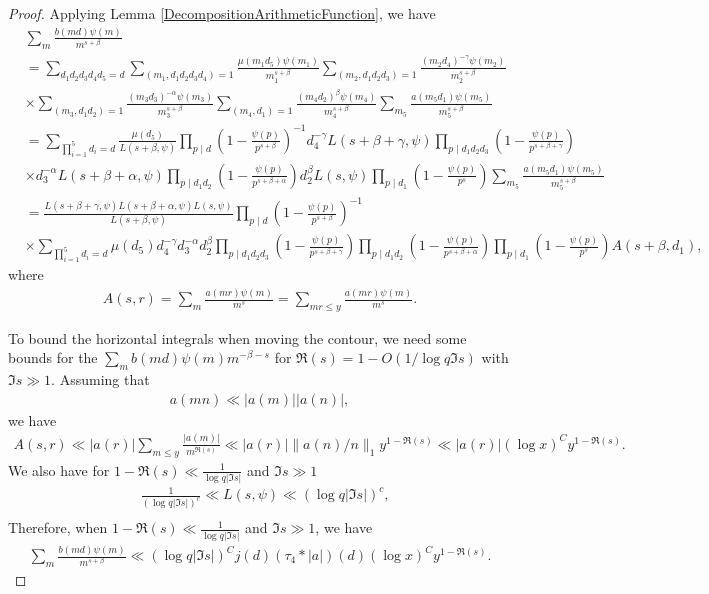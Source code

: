 \documentclass[oneside, 12pt]{amsart}
\theoremstyle{definition}
\begin{document}
\begin{proof}
Applying Lemma \ref{DecompositionArithmeticFunction}, we have 
\begin{align*}
&\sum_{m}\frac{b(md)\psi(m)}{m^{s+\beta}}\\&=\sum_{d_1d_2d_3d_4d_5=d}\sum_{(m_1, d_1d_2d_3d_4)=1}\frac{\mu(m_1d_5)\psi(m_1)}{m_1^{s+\beta}}\sum_{(m_2,d_1d_2d_3)=1}\frac{(m_2d_4)^{-\gamma}\psi(m_2)}{m_2^{s+\beta}}
\\& \times \sum_{(m_3,d_1d_2)=1}\frac{(m_3d_3)^{-\alpha}\psi(m_3)}{m_3^{s+\beta}}\sum_{(m_4,d_1)=1}\frac{(m_4d_2)^\beta\psi(m_4)}{m_4^{s+\beta}}\sum_{m_5}\frac{a(m_5d_1)\psi(m_5)}{m_5^{s+\beta}}\\
& =\sum_{\prod_{i=1}^5d_i=d}\frac{\mu(d_5)}{L(s+\beta, \psi)}\prod_{p\mid d}\left( 1-\frac{\psi(p)}{p^{s+\beta}}\right)^{-1}d_4^{-\gamma}L(s+\beta+\gamma, \psi)\prod_{p\mid d_1d_2d_3}\left(1-\frac{\psi(p)}{p^{s+\beta+\gamma}}\right)\\
& \times d_3^{-\alpha} L(s+\beta+\alpha, \psi)\prod_{p\mid d_1d_2}\left( 1-\frac{\psi(p)}{p^{s+\beta+\alpha}}\right)d_2^\beta L(s, \psi)\prod_{p\mid d_1}\left(1-\frac{\psi(p)}{p^s}\right)\sum_{m_5}\frac{a(m_5d_1)\psi(m_5)}{m_5^{s+\beta}}\\
&=\frac{L(s+\beta+\gamma, \psi)L(s+\beta+\alpha, \psi)L(s, \psi)}{L(s+\beta, \psi)}\prod_{p\mid d}\left( 1-\frac{\psi(p)}{p^{s+\beta}}\right)^{-1}\\& \times \sum_{\prod_{i=1}^5 d_i=d}\mu(d_5)d_4^{-\gamma}d_3^{-\alpha}d_2^\beta\prod_{p\mid d_1d_2d_3}\left(1-\frac{\psi(p)}{p^{s+\beta+\gamma}}\right)\prod_{p\mid d_1d_2}\left(1-\frac{\psi(p)}{p^{s+\beta+\alpha}}\right)\prod_{p\mid d_1}\left(1-\frac{\psi(p)}{p^s}\right)A(s+\beta, d_1),
\end{align*}
where 
\begin{align*}
A(s, r)=\sum_{m}\frac{a(mr)\psi(m)}{m^s}=\sum_{mr\leq y} \frac{a(mr)\psi(m)}{m^s}.
\end{align*}


To bound the horizontal integrals when moving the contour, we need some bounds for the $\sum_{m}b(md)\psi(m)m^{-\beta-s}$ for $\Re(s)=1-O(1/\log q\Im s)$ with $\Im s\gg 1$. 
Assuming that 
\begin{align*}
a(mn)\ll |a(m)||a(n)|,
\end{align*}
we have 
\begin{align*}
A(s,r)\ll |a(r)| \sum_{m\leq y}\frac{|a(m)|}{m^{\Re(s)}}\ll |a(r)| \|a(n)/n\|_1 y^{1-\Re(s)}\ll |a(r)| (\log x)^C y^{1-\Re(s)}.
\end{align*}
We also have for $1-\Re(s)\ll \frac{1}{\log q |\Im s|}$ and $ \Im s\gg1$
\begin{align*}
&\frac{1}{(\log q|\Im s| )^c}\ll L(s,\psi)\ll (\log q |\Im s|)^c,\\
\end{align*}
Therefore, when $1-\Re(s)\ll \frac{1}{\log q |\Im s|}$ and $\Im s\gg 1$, we have
\begin{align}\label{b(md)bound}
\sum_{m} \frac{b(md)\psi(m)}{m^{s+\beta}}\ll (\log q|\Im s|)^C j(d)(\tau_4*|a|)(d)(\log x)^Cy^{1-\Re(s)}.
\end{align}


\end{proof}
\end{document}
